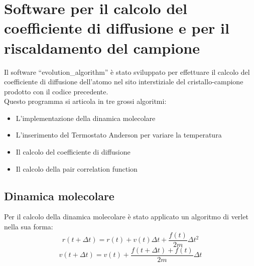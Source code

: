 \documentclass[a4paper,11pt]{article}
\begin{document}
	\section{Software per il calcolo del coefficiente di diffusione e per il riscaldamento del campione} %
	\label{sec:software_per_il_calcolo_del_coefficiente_di_diffusione_e_per_il_riscaldamento_del_campione}
		Il software ``evolution\_algorithm'' è stato sviluppato per effettuare il
		calcolo del coefficiente di diffusione dell'atomo nel sito interstiziale
		del cristallo-campione prodotto con il codice precedente.\\
		Questo programma si articola in tre grossi algoritmi:
		\begin{itemize}
			\item L'implementazione della dinamica molecolare
			\item L'inserimento del Termostato Anderson per variare la temperatura
			\item Il calcolo del coefficiente di diffusione
			\item Il calcolo della pair correlation function
		\end{itemize}
		\subsection{Dinamica molecolare} %
		\label{sub:dinamica_molecolare}
			Per il calcolo della dinamica molecolare è stato 
			applicato un algoritmo di verlet nella sua forma:
			\begin{equation}
				r(t+\Delta t)= r(t) +v(t) \Delta t +\frac{f(t)}{2 m} \Delta t^2
			\end{equation}
			\begin{equation}
				v(t+\Delta t) = v(t) + \frac{f(t+\Delta t)+ f(t)}{2 m} \Delta t
			\end{equation}
\end{document}
